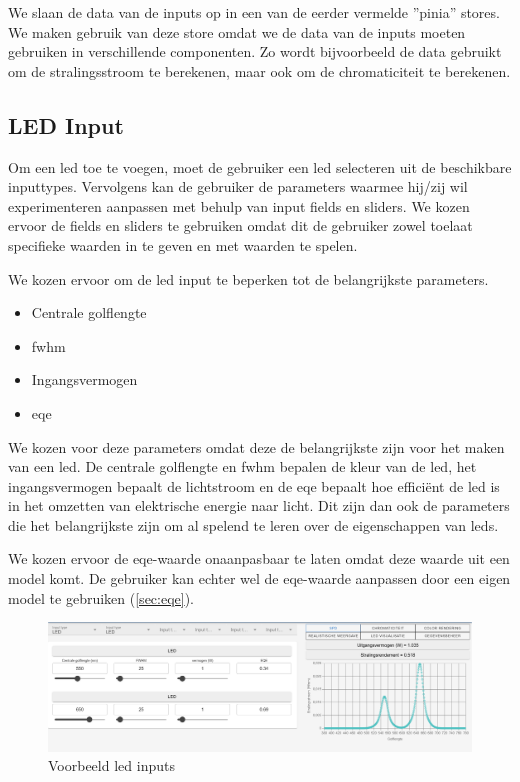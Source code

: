 We slaan de data van de inputs op in een van de eerder vermelde ''pinia'' stores. We maken gebruik van deze store omdat we de data van de inputs moeten gebruiken in verschillende componenten. Zo wordt bijvoorbeeld de data gebruikt om de stralingsstroom te berekenen, maar ook om de chromaticiteit te berekenen.

\subsection{LED Input}

Om een \gls{led} toe te voegen, moet de gebruiker een \gls{led} selecteren uit de beschikbare inputtypes. Vervolgens kan de gebruiker de parameters waarmee hij/zij wil experimenteren aanpassen met behulp van input fields en sliders. We kozen ervoor de fields en sliders te gebruiken omdat dit de gebruiker zowel toelaat specifieke waarden in te geven en met waarden te spelen.

We kozen ervoor om de \gls{led} input te beperken tot de belangrijkste parameters.

\begin{itemize}
    \item Centrale golflengte
    \item \gls{fwhm}
    \item Ingangsvermogen
    \item \gls{eqe}
\end{itemize}

We kozen voor deze parameters omdat deze de belangrijkste zijn voor het maken van een \gls{led}. De centrale golflengte en \gls{fwhm} bepalen de kleur van de \gls{led}, het ingangsvermogen bepaalt de lichtstroom en de \gls{eqe} bepaalt hoe effici\"ent de \gls{led} is in het omzetten van elektrische energie naar licht. Dit zijn dan ook de parameters die het belangrijkste zijn om al spelend te leren over de eigenschappen van \gls{led}s.

We kozen ervoor de \gls{eqe}-waarde onaanpasbaar te laten omdat deze waarde uit een model komt. De gebruiker kan echter wel de \gls{eqe}-waarde aanpassen door een eigen model te gebruiken (\cref{sec:eqe}).

\begin{figure}[H]
    \centering
    \includegraphics[width=1\linewidth]{figs/led_input.png}
    \caption{Voorbeeld \gls{led} inputs}%
    \label{fig:led_input}
\end{figure}

